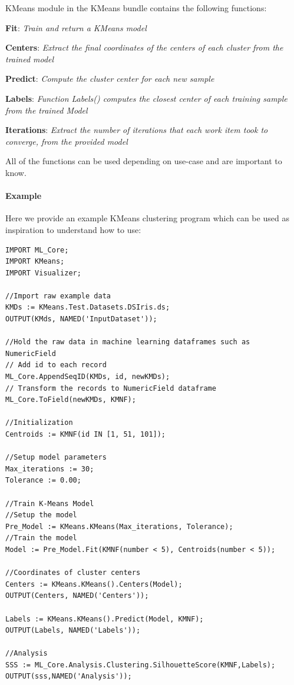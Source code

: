 KMeans module in the KMeans bundle contains the following functions:

\textbf{Fit}: \textit{Train and return a KMeans model}

\textbf{Centers}: \textit{Extract the final coordinates of the centers of each cluster from the trained model}

\textbf{Predict}: \textit{Compute the cluster center for each new sample}

\textbf{Labels}: \textit{Function Labels() computes the closest center of each training sample from the trained Model}

\textbf{Iterations}: \textit{Extract the number of iterations that each work item took to converge, from the provided model}

All of the functions can be used depending on use-case and are important to know.

\paragraph{Example}

Here we provide an example KMeans clustering program which can be used as inspiration to understand how to use:

\begin{lstlisting}
IMPORT ML_Core;
IMPORT KMeans;
IMPORT Visualizer;

//Import raw example data
KMDs := KMeans.Test.Datasets.DSIris.ds;
OUTPUT(KMds, NAMED('InputDataset'));

//Hold the raw data in machine learning dataframes such as NumericField
// Add id to each record
ML_Core.AppendSeqID(KMDs, id, newKMDs);
// Transform the records to NumericField dataframe
ML_Core.ToField(newKMDs, KMNF);

//Initialization
Centroids := KMNF(id IN [1, 51, 101]);

//Setup model parameters
Max_iterations := 30;
Tolerance := 0.00;

//Train K-Means Model
//Setup the model
Pre_Model := KMeans.KMeans(Max_iterations, Tolerance);
//Train the model
Model := Pre_Model.Fit(KMNF(number < 5), Centroids(number < 5));

//Coordinates of cluster centers
Centers := KMeans.KMeans().Centers(Model);
OUTPUT(Centers, NAMED('Centers'));

Labels := KMeans.KMeans().Predict(Model, KMNF);
OUTPUT(Labels, NAMED('Labels'));

//Analysis
SSS := ML_Core.Analysis.Clustering.SilhouetteScore(KMNF,Labels);
OUTPUT(sss,NAMED('Analysis'));
\end{lstlisting}


